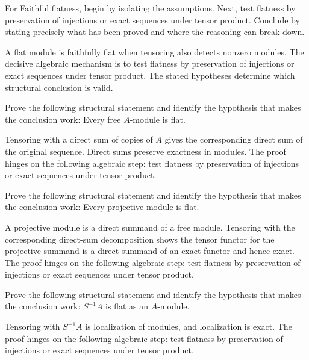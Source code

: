 \begin{problem}\label{prob:v14-problem-08}
For Faithful flatness, begin by isolating the assumptions. Next, test flatness by preservation of injections or exact sequences under tensor product. Conclude by stating precisely what has been proved and where the reasoning can break down.
\end{problem}
\begin{solution}
A flat module is faithfully flat when tensoring also detects nonzero modules. The decisive algebraic mechanism is to test flatness by preservation of injections or exact sequences under tensor product. The stated hypotheses determine which structural conclusion is valid.
\end{solution}

\begin{problem}\label{prob:v14-problem-09}
Prove the following structural statement and identify the hypothesis that makes the conclusion work: Every free $A$-module is flat.
\end{problem}
\begin{solution}
Tensoring with a direct sum of copies of $A$ gives the corresponding direct sum of the original sequence. Direct sums preserve exactness in modules. The proof hinges on the following algebraic step: test flatness by preservation of injections or exact sequences under tensor product.
\end{solution}

\begin{problem}\label{prob:v14-problem-10}
Prove the following structural statement and identify the hypothesis that makes the conclusion work: Every projective module is flat.
\end{problem}
\begin{solution}
A projective module is a direct summand of a free module. Tensoring with the corresponding direct-sum decomposition shows the tensor functor for the projective summand is a direct summand of an exact functor and hence exact. The proof hinges on the following algebraic step: test flatness by preservation of injections or exact sequences under tensor product.
\end{solution}

\begin{problem}\label{prob:v14-problem-11}
Prove the following structural statement and identify the hypothesis that makes the conclusion work: $S^{-1}A$ is flat as an $A$-module.
\end{problem}
\begin{solution}
Tensoring with $S^{-1}A$ is localization of modules, and localization is exact. The proof hinges on the following algebraic step: test flatness by preservation of injections or exact sequences under tensor product.
\end{solution}

